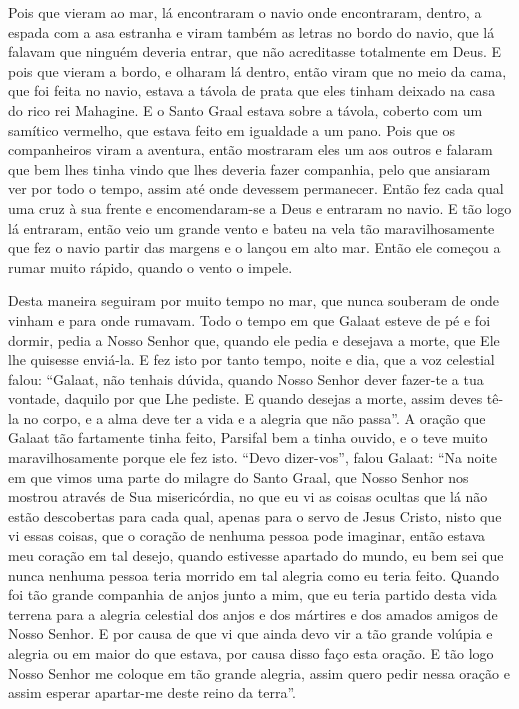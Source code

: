 Pois que vieram ao mar, lá encontraram o navio onde encontraram, dentro, a
espada com a asa estranha e viram também as letras no bordo do navio, que lá
falavam que ninguém deveria entrar, que não acreditasse totalmente em Deus. E
pois que vieram a bordo, e olharam lá dentro, então viram que no meio da cama,
que foi feita no navio, estava a távola de prata que eles tinham deixado na
casa do rico rei Mahagine. E o Santo Graal estava sobre a távola, coberto com
um samítico vermelho, que estava feito em igualdade a um pano. Pois que os
companheiros viram a aventura, então mostraram eles um aos outros e falaram que
bem lhes tinha vindo que lhes deveria fazer companhia, pelo que ansiaram ver
por todo o tempo, assim até onde devessem permanecer. Então fez cada
qual uma cruz à sua frente e encomendaram-se a Deus e entraram no navio. E tão
logo lá entraram, então veio um grande vento e bateu na vela tão
maravilhosamente que fez o navio partir das margens e o lançou em alto mar.
Então ele começou a rumar muito rápido, quando o vento o impele. 

Desta maneira seguiram por muito tempo no mar, que nunca souberam de onde vinham
e para onde rumavam. Todo o tempo em que Galaat esteve de pé e foi dormir,
pedia a Nosso Senhor que, quando ele pedia e desejava a morte, que Ele lhe
quisesse enviá-la. E fez isto por tanto tempo, noite e dia, que a voz celestial
falou: “Galaat, não tenhais dúvida, quando Nosso Senhor dever fazer-te a tua
vontade, daquilo por que Lhe pediste. E quando desejas a morte, assim deves
tê-la no corpo, e a alma deve ter a vida e a alegria que não passa”. A
oração que Galaat tão fartamente tinha feito, Parsifal bem a tinha ouvido, e o
teve muito maravilhosamente porque ele fez isto. “Devo dizer-vos”, falou
Galaat: “Na noite em que vimos uma parte do milagre do Santo Graal, que Nosso
Senhor nos mostrou através de Sua misericórdia, no que eu vi as coisas ocultas
que lá não estão descobertas para cada qual, apenas para o servo de Jesus
Cristo, nisto que vi essas coisas, que o coração de nenhuma pessoa pode
imaginar, então estava meu coração em tal desejo, quando estivesse apartado do
mundo, eu bem sei que nunca nenhuma pessoa teria morrido em tal alegria como eu
teria feito. Quando foi tão grande companhia de anjos junto a mim, que eu teria
partido desta vida terrena para a alegria celestial dos anjos e dos mártires e
dos amados amigos de Nosso Senhor. E por causa de que vi que ainda devo vir a
tão grande volúpia e alegria ou em maior do que estava, por causa disso faço
esta oração. E tão logo Nosso Senhor me coloque em tão grande alegria, assim
quero pedir nessa oração e assim esperar apartar-me deste reino da terra”. 

